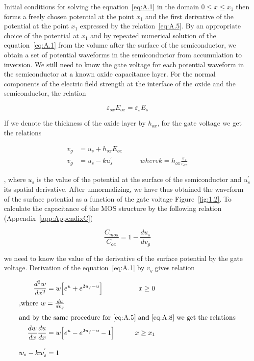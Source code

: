 Initial conditions for solving the equation~\ref{eq:A.1} in the domain
${0\leq{x}\leq{x_1}}$ then forms a freely chosen potential at the
point $x_1$ and the first derivative of the potential at the point
$x_1$ expressed by the relation~\ref{eq:A.5}. By an appropriate choice
of the potential at $x_1$ and by repeated numerical solution of the
equation~\ref{eq:A.1} from the volume after the surface of the
semiconductor, we obtain a set of potential waveforms in the
semiconductor from accumulation to inversion. We still need to know
the gate voltage for each potential waveform in the semiconductor at a
known oxide capacitance layer.  For the normal components of the
electric field strength at the interface of the oxide and the
semiconductor, the relation

\begin{equation}\label{eq:A.6}
  \varepsilon_{ox}E_{ox} = \varepsilon_s{E_s}
\end{equation}

If we denote the thickness of the oxide layer by $h_{ox}$, for the
gate voltage we get the relations

\begin{align}
  v_g &= u_s + h_{ox}E_{ox} \label{eq:A.7} \\
  v_g &= u_s - ku_{s}^{'} \qquad\qquad where {k = h_{ox}\frac{\varepsilon_s}{\varepsilon_{ox}}} \label{eq:A.8}
\end{align}

, where $u_s$ is the value of the potential at the surface of the
semiconductor and $u_{s}^{'}$ its spatial derivative. After
unnormalizing, we have thus obtained the waveform of the surface
potential as a function of the gate voltage Figure~\ref{fig:1.2}. To
calculate the capacitance of the MOS structure by the following
relation (Appendix~\ref{app:AppendixC})

\begin{equation}\label{eq:A.9}
  \frac{C_{mos}}{C_{ox}} = 1 - \frac{du_s}{dv_g}
\end{equation}

we need to know the value of the derivative of the surface potential
by the gate voltage. Derivation of the equation~\ref{eq:A.1} by $v_g$
gives relation

\begin{samepage}
  \begin{subequations}\label{eq:A.10}
    \begin{align}
      \frac{d^{2}w}{dx^2} &= w \Big[e^u + e^{2u_f-u}\Big] \qquad &{x\ge{0}} \label{eq:A.10a} \\
      \intertext{,where $w=\frac{du}{dv_g}$}
      \intertext{and by the same procedure for~\ref{eq:A.5} and~\ref{eq:A.8} we get the relations}
      \frac{dw}{dx}\frac{du}{dx} &= w \Big[e^u - e^{2u_f-u} - 1\Big] \qquad &{x\ge{x_1}} \label{eq:A.10b} \\[0.3cm]
      w_s - kw_s^{'} &= 1 \label{eq:A.10c}
    \end{align}
  \end{subequations}
\end{samepage}

